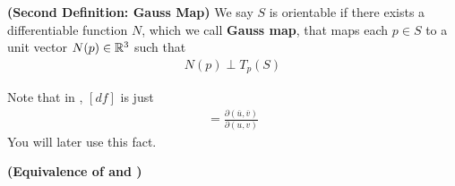 \documentclass{report}
\begin{document}
\begin{definition}
\label{SD}
\textbf{(Second Definition: Gauss Map)} We say $S$ is orientable if there exists a differentiable function $N$, which we call \textbf{Gauss map}, that maps each $p\in  S$ to a unit vector $N(p)\in\mathbb{R}^3$ such that 
\begin{align*}
N(p)\perp T_p(S)
\end{align*}
\end{definition}
\begin{mdframed}
Note that in , $[df]$ is just
 \begin{align*}
[df]= \frac{\partial (\overline{u},\overline{v})}{\partial (u,v)}
\end{align*}
You will later use this fact. 
\end{mdframed}
\begin{theorem}
\textbf{(Equivalence of  and )}  
\end{theorem}
\end{document}
